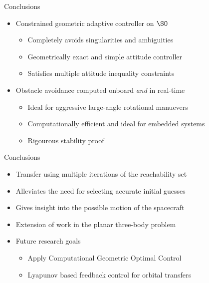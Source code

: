 \begin{frame}{Conclusions} %

    \begin{itemize}
        \item Constrained geometric adaptive controller on \( \SO \)
        \begin{itemize}
            \item Completely avoids singularities and ambiguities 
            \item Geometrically exact and simple attitude controller
            \item Satisfies multiple attitude inequality constraints 
        \end{itemize}
        \pause
        \vs
        \item Obstacle avoidance computed onboard \emph{and} in real-time
        \begin{itemize}
            \item Ideal for aggressive large-angle rotational manuevers
            \item Computationally efficient and ideal for embedded systems 
            \item Rigourous stability proof 
        \end{itemize}
    \end{itemize}

\end{frame}   %

\begin{frame}{Conclusions} %
\begin{itemize}
    \item Transfer using multiple iterations of the reachability set
    \item Alleviates the need for selecting accurate initial guesses 
    \item Gives insight into the possible motion of the spacecraft
    \item Extension of work in the planar three-body problem
    \item Future research goals
        \begin{itemize}
            \item Apply Computational Geometric Optimal Control
            \item Lyapunov based feedback control for orbital transfers
        \end{itemize}
\end{itemize}

\end{frame}   %

